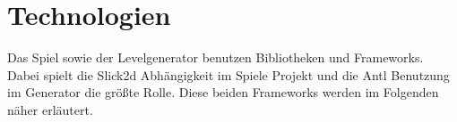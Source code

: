 \section{Technologien}

Das Spiel sowie der Levelgenerator benutzen Bibliotheken und Frameworks. Dabei spielt die Slick2d Abhängigkeit im Spiele Projekt und die Antl Benutzung im Generator die größte Rolle. Diese beiden Frameworks werden im Folgenden näher erläutert.


